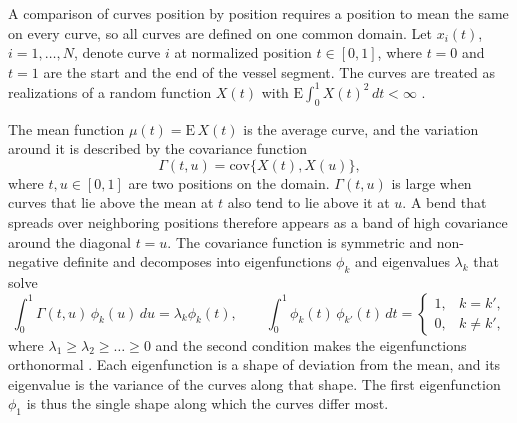A comparison of curves position by position requires a position to mean the same on every curve, so all curves are defined on one common domain.
Let $x_i(t)$, $i = 1, \dots, N$, denote curve $i$ at normalized position $t \in [0, 1]$, where $t = 0$ and $t = 1$ are the start and the end of the vessel segment.
The curves are treated as realizations of a random function $X(t)$ with $\mathrm{E}\int_0^1 X(t)^2 \, dt < \infty$ \cite{wang2016fda}.

The mean function $\mu(t) = \mathrm{E}\,X(t)$ is the average curve, and the variation around it is described by the covariance function
\begin{equation}
  \Gamma(t, u) = \mathrm{cov}\{X(t), X(u)\},
  \label{eq:tech-fpca-cov}
\end{equation}
where $t, u \in [0, 1]$ are two positions on the domain.
$\Gamma(t, u)$ is large when curves that lie above the mean at $t$ also tend to lie above it at $u$.
A bend that spreads over neighboring positions therefore appears as a band of high covariance around the diagonal $t = u$.
The covariance function is symmetric and non-negative definite and decomposes into eigenfunctions $\phi_k$ and eigenvalues $\lambda_k$ that solve
\begin{equation}
  \int_0^1 \Gamma(t, u)\, \phi_k(u)\, du = \lambda_k \phi_k(t),
  \qquad
  \int_0^1 \phi_k(t)\, \phi_{k'}(t)\, dt =
  \begin{cases} 1, & k = k', \\ 0, & k \neq k', \end{cases}
  \label{eq:tech-fpca-eigen}
\end{equation}
where $\lambda_1 \ge \lambda_2 \ge \dots \ge 0$ and the second condition makes the eigenfunctions orthonormal \cite{wang2016fda}.
Each eigenfunction is a shape of deviation from the mean, and its eigenvalue is the variance of the curves along that shape.
The first eigenfunction $\phi_1$ is thus the single shape along which the curves differ most.

